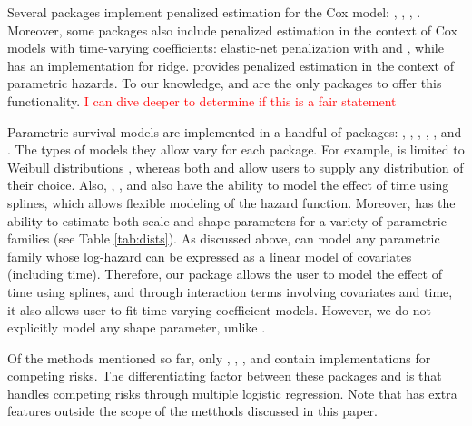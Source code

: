 \documentclass[
]{jss}
\begin{document}
Several packages implement penalized estimation for the Cox model:
 \citeyearpar{regpathcox}, 
\citeyearpar{park_hastie},  \citeyearpar{l1penal},
 \citeyearpar{gerds_blanche}. Moreover, some
packages also include penalized estimation in the context of Cox models
with time-varying coefficients: elastic-net penalization with
 \citeyearpar{perperoglou} and 
\citeyearpar{clements_liu}, while 
\citeyearpar{survival-package} has an implementation for ridge.
 provides penalized estimation in the context of
parametric hazards. To our knowledge,  and 
are the only packages to offer this functionality.
\textcolor{red}{I can dive deeper to determine if this is a fair statement}

Parametric survival models are implemented in a handful of packages:
 \citeyearpar{mahani2015bayesian}, 
\citeyearpar{flexsurv},  \citeyearpar{smoothHazard},
 \citeyearpar{clements_liu}, 
\citeyearpar{scheike2014estimating}, and . The types of
models they allow vary for each package. For example, 
is limited to Weibull distributions \citeyearpar{smoothHazard}, whereas
both  and  allow users to supply any
distribution of their choice. Also, , ,
 and  also have the ability to model the effect of
time using splines, which allows flexible modeling of the hazard
function. Moreover,  has the ability to estimate both
scale and shape parameters for a variety of parametric families (see
Table \ref{tab:dists}). As discussed above,  can model any
parametric family whose log-hazard can be expressed as a linear model of
covariates (including time). Therefore, our package allows the user to
model the effect of time using splines, and through interaction terms
involving covariates and time, it also allows user to fit time-varying
coefficient models. However, we do not explicitly model any shape
parameter, unlike .

Of the methods mentioned so far, only , ,
,  and  contain implementations for
competing risks. The differentiating factor between these packages and
 is that  handles competing risks through
multiple logistic regression. Note that  has extra features
outside the scope of the metthods discussed in this paper.
\end{document}
